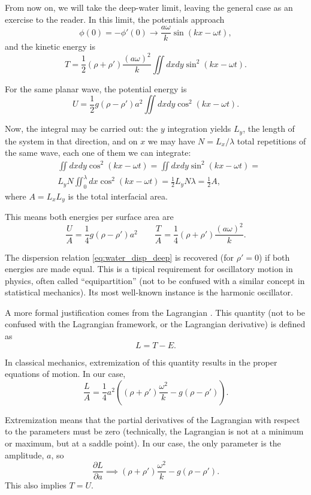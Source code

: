 From now on, we will take the deep-water limit, leaving the general
case as an exercise to the reader. In this limit, the potentials approach
\[
  \phi(0)  = - \phi'(0) \to \frac{a \omega  }{ k }   \sin(kx -\omega t ) ,
\]
and the kinetic energy is
\[
  T = 
  \frac12 (\rho+\rho')     \frac{ (a \omega)^2  }{ k }
  \iint dx dy   \sin^2(kx -\omega t ) .
\]

For the same planar wave, the potential energy is
\[
  U = 
  \frac12 g (\rho-\rho') a^2  
  \iint dx dy   \cos^2(kx -\omega t ) .
\]

Now, the integral may be carried out: the $y$ integration yields
$L_y$, the length of the system in that direction, and on $x$ we may
have $N = L_x /\lambda $ total repetitions of the same wave, each one
of them we can integrate:
\begin{align*}
&  \iint dx dy   \cos^2(kx -\omega t ) =   \iint dx dy   \sin^2(kx -\omega t ) = \\
&  L_y N  \iint_0^\lambda dx   \cos^2(kx -\omega t ) =
  \frac12 L_y N \lambda = \frac12 A,
\end{align*}
where $A=L_x L_y$ is the total interfacial area.

This means both energies per surface area are
\[
  \frac{U}{A} = \frac14 g (\rho-\rho') a^2 \qquad
  \frac{T}{A} = \frac14 (\rho+\rho') \frac{ (a \omega)^2  }{ k } .
\]

The dispersion relation \ref{eq:water_disp_deep} is recovered (for
$\rho'=0$) if both energies are made equal. This is a tipical
requirement for oscillatory motion in physics, often called
``equipartition'' (not to be confused with a similar concept
in statistical mechanics). Its most well-known instance is the
harmonic oscillator.

A more formal justification comes from the Lagrangian%
.  This quantity (not to be confused with the
Lagrangian framework, or the Lagrangian derivative) is defined as
\[
  L = T - E .
\]

In classical mechanics, extremization of this quantity results in
the proper equations of motion. In our case,
\[
  \frac{L}{A} = \frac14 a^2
  \left(
    (\rho+\rho') \frac{ \omega^2  }{ k } -
    g (\rho-\rho')
  \right) .
\]

Extremization means that the partial derivatives of the Lagrangian
with respect to the parameters must be zero (technically, the
Lagrangian is not at a minimum or maximum, but at a saddle point).  In
our case, the only parameter is the amplitude, $a$, so
\[
\frac{\partial L}{\partial a} \implies 
    (\rho+\rho') \frac{ \omega^2  }{ k } -
    g (\rho-\rho') .
\]
This also implies $T=U$.

